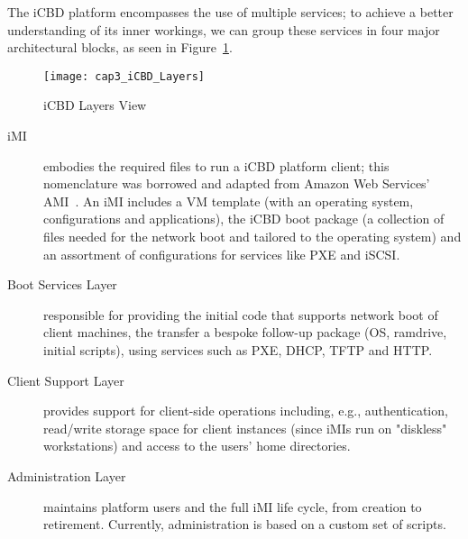 
The iCBD platform encompasses the use of multiple services; to achieve a better understanding of its inner workings, we can group these services in four major architectural blocks, as seen in Figure~\ref{fig:icbd_layers}.


\begin{figure}[htbp]
	\centering
	\texttt{[image: cap3\_iCBD\_Layers]}
	\caption{iCBD Layers View}
	\label{fig:icbd_layers}
\end{figure}


\begin{description}
	\item [\acrfull{iMI}] embodies the required files to run a iCBD platform client; this nomenclature was borrowed and adapted from Amazon Web Services’ AMI~\cite{aws_ami}. An iMI includes a VM template (with an operating system, configurations and applications), the iCBD boot package (a collection of files needed for the network boot and tailored to the operating system) and an assortment of configurations for services like PXE and iSCSI.
	\item [Boot Services Layer] responsible for providing the initial code that supports network boot of client machines, the transfer a bespoke follow-up package (OS, ramdrive, initial scripts), using services such as \acrshort{PXE}, \acrshort{DHCP}, \acrshort{TFTP} and \acrshort{HTTP}.
	\item [Client Support Layer] provides support for client-side operations including, e.g., authentication, read/write storage space for client instances (since iMIs run on "diskless" workstations) and access to the users' home directories.
	\item [Administration Layer] maintains platform users and the full iMI life cycle, from creation to retirement. Currently, administration is based on a custom set of scripts.

\end{description}
